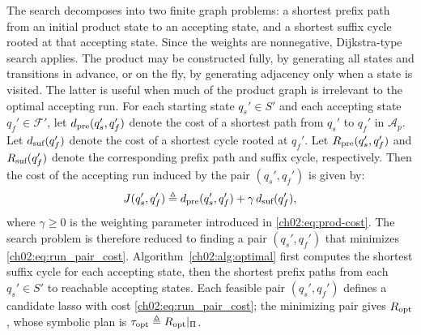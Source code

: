 The search decomposes into two finite graph problems: a shortest prefix path
from an initial product state to an accepting state, and a shortest suffix cycle
rooted at that accepting state. Since the weights are nonnegative,
Dijkstra-type search applies. The product may be constructed fully, by
generating all states and transitions in advance, or on the fly, by generating
adjacency only when a state is visited. The latter is useful when much of the
product graph is irrelevant to the optimal accepting run.
For each starting state $q_s' \in S'$ and each accepting state
$q_f' \in \mathcal{F}'$, let
$d_{\textup{pre}}(q_s',q_f')$
denote the cost of a shortest path from $q_s'$ to $q_f'$ in $\mathcal{A}_p$.
Let
$d_{\textup{suf}}(q_f')$
denote the cost of a shortest cycle rooted at $q_f'$. Let
$R_{\textup{pre}}(q_s',q_f')$
and
$R_{\textup{suf}}(q_f')$
denote the corresponding prefix path and suffix cycle, respectively. Then the
cost of the accepting run induced by the pair $(q_s',q_f')$ is given by:
\begin{equation}
J(q_s',q_f')
\triangleq
d_{\textup{pre}}(q_s',q_f')
+
\gamma\, d_{\textup{suf}}(q_f'),
\label{ch02:eq:run_pair_cost}
\end{equation}
where $\gamma \geq 0$ is the weighting parameter introduced in
\eqref{ch02:eq:prod-cost}. The search problem is therefore reduced to finding a
pair $(q_s',q_f')$ that minimizes \eqref{ch02:eq:run_pair_cost}.
Algorithm~\ref{ch02:alg:optimal} first computes the shortest suffix cycle for
each accepting state, then the shortest prefix paths from each
$q_s' \in S'$ to reachable accepting states. Each feasible pair
$(q_s',q_f')$ defines a candidate lasso with cost
\eqref{ch02:eq:run_pair_cost}; the minimizing pair gives
$R_{\textup{opt}}$, whose symbolic plan is
$\tau_{\textup{opt}} \triangleq R_{\textup{opt}}|_{\Pi}$.

